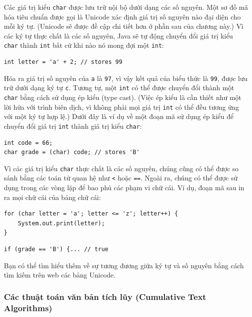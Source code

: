 Các giá trị kiểu \texttt{char} được lưu trữ nội bộ dưới dạng các số
nguyên. Một sơ đồ mã hóa tiêu chuẩn được gọi là Unicode xác định giá trị
số nguyên nào đại diện cho mỗi ký tự. (Unicode sẽ được đề cập chi tiết
hơn ở phần sau của chương này.) Vì các ký tự thực chất là các số nguyên,
Java sẽ tự động chuyển đổi giá trị kiểu \texttt{char} thành \texttt{int}
bất cứ khi nào nó mong đợi một \texttt{int}:

\begin{verbatim}
int letter = 'a' + 2; // stores 99
\end{verbatim}

Hóa ra giá trị số nguyên của
\texttt{\textquotesingle{}a\textquotesingle{}} là \texttt{97}, vì vậy
kết quả của biểu thức là \texttt{99}, được lưu trữ dưới dạng ký tự
\texttt{\textquotesingle{}c\textquotesingle{}}. Tương tự, một
\texttt{int} có thể được chuyển đổi thành một \texttt{char} bằng cách sử
dụng ép kiểu (type cast). (Việc ép kiểu là cần thiết như một lời hứa với
trình biên dịch, vì không phải mọi giá trị \texttt{int} có thể đều tương
ứng với một ký tự hợp lệ.) Dưới đây là ví dụ về một đoạn mã sử dụng ép
kiểu để chuyển đổi giá trị \texttt{int} thành giá trị kiểu
\texttt{char}:

\begin{verbatim}
int code = 66;
char grade = (char) code; // stores 'B'
\end{verbatim}

Vì các giá trị kiểu \texttt{char} thực chất là các số nguyên, chúng cũng
có thể được so sánh bằng các toán tử quan hệ như \texttt{\textless{}}
hoặc \texttt{==}. Ngoài ra, chúng có thể được sử dụng trong các vòng lặp
để bao phủ các phạm vi chữ cái. Ví dụ, đoạn mã sau in ra mọi chữ cái của
bảng chữ cái:

\begin{verbatim}
for (char letter = 'a'; letter <= 'z'; letter++) {
    System.out.print(letter);
}
\end{verbatim}

\begin{verbatim}
if (grade == 'B') {... // true
\end{verbatim}

Bạn có thể tìm hiểu thêm về sự tương đương giữa ký tự và số nguyên bằng
cách tìm kiếm trên web các bảng Unicode.

\subsubsection{Các thuật toán văn bản tích lũy (Cumulative Text
Algorithms)}\label{cuxe1c-thuux1eadt-touxe1n-vux103n-bux1ea3n-tuxedch-lux169y-cumulative-text-algorithms}

